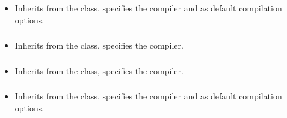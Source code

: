 \subsubsection*{}\label{subsec:CompileNasm}

\begin{itemize}[label={}]
    \item Inherits from the \hyperref[subsec:CompileBase]{} class, specifies the 
          compiler and  as default compilation options.
\end{itemize}

\subsubsection*{}\label{subsec:CompileC}

\begin{itemize}[label={}]
    \item Inherits from the \hyperref[subsec:CompileBase]{} class, specifies the 
          compiler.
\end{itemize}

\subsubsection*{}\label{subsec:CompileCpp}

\begin{itemize}[label={}]
    \item Inherits from the \hyperref[subsec:CompileBase]{} class, specifies the 
          compiler.
\end{itemize}

\subsubsection*{}\label{subsec:CompileCSharp}

\begin{itemize}[label={}]
    \item Inherits from the \hyperref[subsec:CompileBase]{} class, specifies the 
          compiler and  as default compilation options.
\end{itemize}

\subsubsection*{}\label{subsec:CompileGo}

